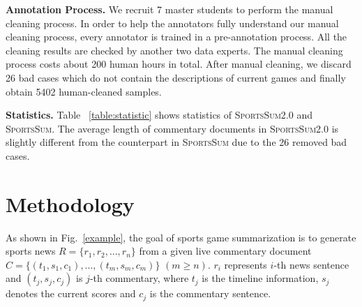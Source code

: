 \vspace{1ex}
\noindent\textbf{Annotation Process.}
We recruit 7 master students to perform the manual cleaning process. In order to help the annotators fully understand our manual cleaning process, every annotator is trained in a pre-annotation process. All the cleaning results are checked by another two data experts. The manual cleaning process costs about 200 human hours in total. After manual cleaning, we discard 26 bad cases which do not contain the descriptions of current games and finally obtain 5402 human-cleaned samples. 

\vspace{1ex}
\noindent\textbf{Statistics.}
Table ~\ref{table:statistic} shows statistics of \textsc{SportsSum2.0} and \textsc{SportsSum}. The average length of commentary documents in \textsc{SportsSum2.0} is slightly different from the counterpart in \textsc{SportsSum} due to the 26 removed bad cases.

\begin{table}[t]
\setlength{\belowcaptionskip}{5pt}
\centering
{}
\caption{The statistics of \textsc{SportsSum2.0} and \textsc{SportsSum}.}
\label{table:statistic}
\vspace{-7pt}
\end{table}

\section{Methodology}
As shown in Fig.~\ref{example}, the goal of sports game summarization is to generate sports news $R=\{r_{1},r_{2},...,r_{n}\} $ from a given live commentary document $C=\{(t_{1},s_{1},c_{1}),...,(t_{m},s_{m},c_{m})\}$ $(m \geq n)$. $r_{i}$ represents $i$-th news sentence and $(t_{j},s_{j},c_{j})$ is $j$-th commentary, where $t_{j}$ is the timeline information, $s_{j}$ denotes the current scores and $c_{j}$ is the commentary sentence.

